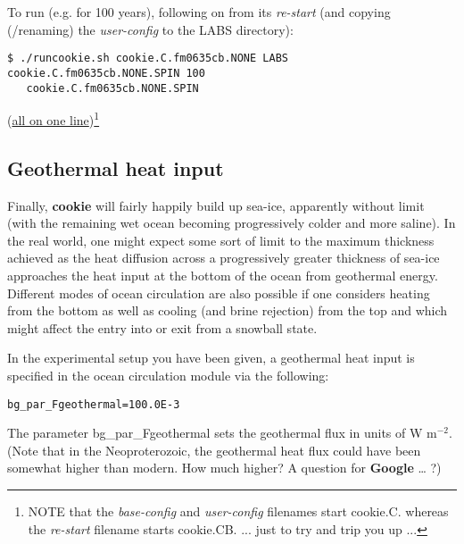 To run (e.g. for 100 years), following on from its \textit{re-start} (and copying (/renaming) the \textit{user-config} to the \textsf{\footnotesize LABS} directory):

\vspace{-2mm}\small\begin{verbatim}
$ ./runcookie.sh cookie.C.fm0635cb.NONE LABS cookie.C.fm0635cb.NONE.SPIN 100
   cookie.C.fm0635cb.NONE.SPIN
\end{verbatim}\normalsize\vspace{-2mm}
(\uline{all on one line})\footnote{NOTE that the \textit{base-config} and \textit{user-config} filenames start \textsf{\footnotesize cookie.C.} whereas the\textit{ re-start} filename starts \textsf{\footnotesize cookie.CB.} ... just to try and trip you up ...}

\vspace{1mm}


\subsection{Geothermal heat input}

Finally, \textbf{cookie} will fairly happily build up sea-ice, apparently without limit (with the remaining wet ocean becoming progressively colder and more saline). In the real world, one might expect some sort of limit to the maximum thickness achieved as the heat diffusion across a progressively greater thickness of sea-ice approaches the heat input at the bottom of the ocean from geothermal energy. Different modes of ocean circulation are also possible if one considers heating from the bottom as well as cooling (and brine rejection) from the top and which might affect the entry into or exit from a snowball state.

\newpage

In the experimental setup you have been given, a geothermal heat input is specified in the ocean circulation module via the following:

\vspace{-2mm}\small\begin{verbatim}
bg_par_Fgeothermal=100.0E-3
\end{verbatim}\normalsize\vspace{-2mm}
The parameter \textsf{\footnotesize bg\_par\_Fgeothermal} sets the geothermal flux in units of W m$^{-2}$. (Note that in the Neoproterozoic, the geothermal heat flux could have been somewhat higher than modern. How much higher? A question for \textbf{Google} … ?)

